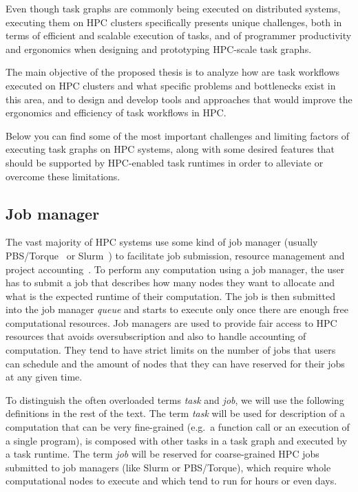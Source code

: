 Even though task graphs are commonly being executed on distributed systems,
executing them on HPC clusters specifically presents unique challenges, both in terms of
efficient and scalable execution of tasks, and of programmer productivity and ergonomics when
designing and prototyping HPC-scale task graphs.

The main objective of the proposed thesis is to analyze how are task workflows executed on HPC
clusters and what specific problems and bottlenecks exist in this area, and to design and develop
tools and approaches that would improve the ergonomics and efficiency of task workflows in HPC.

Below you can find some of the most important challenges and limiting factors of executing task graphs
on HPC systems, along with some desired features that should be supported by HPC-enabled task
runtimes in order to alleviate or overcome these limitations.

\subsection{Job manager}
The vast majority of HPC systems use some kind of job manager (usually PBS/Torque~\cite{pbs} or
Slurm~\cite{slurm}) to facilitate job submission, resource management and project
accounting~\cite{slurm-schedmd}. To perform any computation using a job manager, the user has to
submit a job that describes how many nodes they want to allocate and what is the expected
runtime of their computation. The job is then submitted into the job manager \emph{queue} and
starts to execute only once there are enough free computational resources. Job managers are used to
provide fair access to HPC resources that avoids oversubscription and also to handle accounting
of computation. They tend to have strict limits on the number of jobs that users can schedule
and the amount of nodes that they can have reserved for their jobs at any given time.

To distinguish the often overloaded terms \emph{task} and \emph{job}, we will use the following
definitions in the rest of the text. The term \emph{task} will be used for description of a
computation that can be very fine-grained (e.g.\ a function call or an execution of a single
program), is composed with other tasks in a task graph and executed by a task runtime. The term
\emph{job} will be reserved for coarse-grained HPC jobs submitted to job managers (like Slurm or
PBS/Torque), which require whole computational nodes to execute and which tend to run for hours
or even days.

